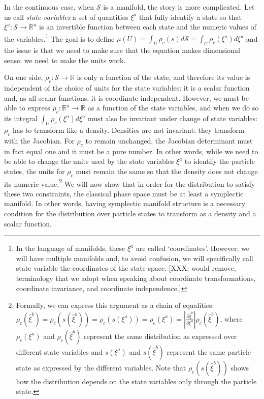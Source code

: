 \documentclass[letterpaper]{article}
\begin{document}
In the continuous case, when $\mathcal{S}$ is a manifold, the story is more complicated. Let us call \textit{state variables} a set of quantities $\xi^a$ that fully identify a state so that $\xi^a: \mathcal{S} \to \mathbb{R}^n$ is an invertible function between each state and the numeric values of the variables.\footnote{In the language of manifolds, these $\xi^a$ are called `coordinates'. However, we will have multiple manifolds and, to avoid confusion, we will specifically call state variable the coordinates of the state space. [XXX: would remove, terminology that we adopt when speaking about coordinate transformations, coordinate invariance, and coordinate independence.]} The goal is to define $\mu(U) = \int_U \rho_c(s) d\mathcal{S} = \int_U \rho_c(\xi^a) d\xi^a$ and the issue is that we need to make sure that the equation makes dimensional sense: we need to make the units work.

On one side, $\rho_c : \mathcal{S} \to \mathbb{R}$ is only a function of the state, and therefore its value is independent of the choice of units for the state variables: it is a scalar function and, as all scalar functions, it is coordinate independent. However, we must be able to express $\rho_c : \mathbb{R}^n \to \mathbb{R}$ as a function of the state variables, and when we do so its integral $\int_U \rho_c(\xi^a) d\xi^a$ must also be invariant under change of state variables: $\rho_c$ has to transform like a density. Densities are not invariant: they transform with the Jacobian. For $\rho_c$ to remain unchanged, the Jacobian determinant must in fact equal one and it must be a pure number. In other words, while we need to be able to change the units used by the state variables $\xi^a$ to identify the particle states, the units for $\rho_c$ must remain the same so that the density does not change its numeric value.\footnote{Formally, we can express this argument as a chain of equalities: $\rho_c(\hat{\xi}^b)=\rho_c(s(\hat{\xi}^b))=\rho_c(s(\xi^a))=\rho_c(\xi^a) = \left|\frac{\partial \hat{\xi}^b}{\partial \xi^a} \right| \rho_c(\hat\xi^b)$, where $\rho_c(\xi^a)$ and $\rho_c(\hat{\xi}^b)$ represent the same distribution as expressed over different state variables and $s(\xi^a)$ and $s(\hat{\xi}^b)$ represent the same particle state as expressed by the different variables. Note that $\rho_c(s(\hat{\xi}^b))$ shows how the distribution depends on the state variables only through the particle state.} We will now show that in order for the distribution to satisfy these two constraints, the classical phase space must be at least a symplectic manifold. In other words, having symplectic manifold structure is a necessary condition for the distribution over particle states to transform as a density and a scalar function.
\end{document}
